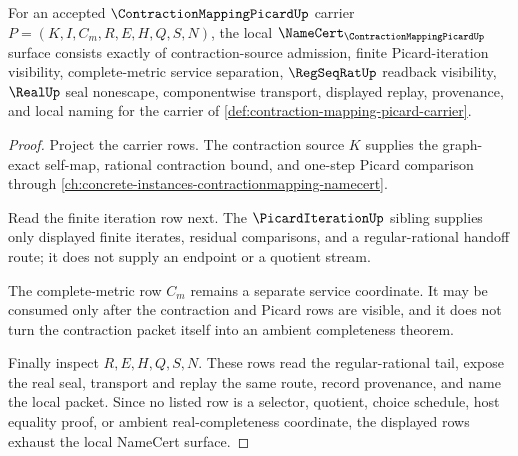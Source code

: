 \begin{theorem}
\label{thm:contraction-mapping-picard-namecert-obligations}
For an accepted $\ContractionMappingPicardUp$ carrier $P=(K,I,C_m,R,E,H,Q,S,N)$, the local $\NameCert_{\ContractionMappingPicardUp}$ surface consists exactly of contraction-source admission, finite Picard-iteration visibility, complete-metric service separation, $\RegSeqRatUp$ readback visibility, $\RealUp$ seal nonescape, componentwise transport, displayed replay, provenance, and local naming for the carrier of \autoref{def:contraction-mapping-picard-carrier}.
\end{theorem}
\begin{proof}
Project the carrier rows. The contraction source $K$ supplies the graph-exact self-map, rational contraction bound, and one-step Picard comparison through \autoref{ch:concrete-instances-contractionmapping-namecert}.

Read the finite iteration row next. The $\PicardIterationUp$ sibling supplies only displayed finite iterates, residual comparisons, and a regular-rational handoff route; it does not supply an endpoint or a quotient stream.

The complete-metric row $C_m$ remains a separate service coordinate. It may be consumed only after the contraction and Picard rows are visible, and it does not turn the contraction packet itself into an ambient completeness theorem.

Finally inspect $R,E,H,Q,S,N$. These rows read the regular-rational tail, expose the real seal, transport and replay the same route, record provenance, and name the local packet. Since no listed row is a selector, quotient, choice schedule, host equality proof, or ambient real-completeness coordinate, the displayed rows exhaust the local NameCert surface.
\end{proof}

